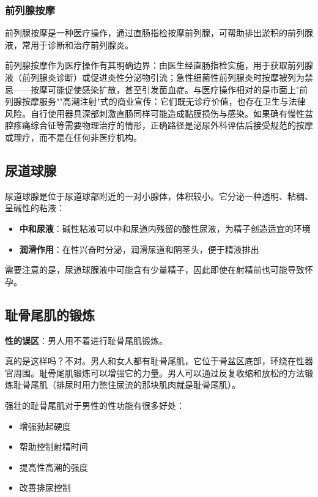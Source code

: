 \documentclass[12pt,a4paper,twoside]{ctexbook}
\begin{document}
\subsubsection{前列腺按摩}

前列腺按摩是一种医疗操作，通过直肠指检按摩前列腺，可帮助排出淤积的前列腺液，常用于诊断和治疗前列腺炎。


前列腺按摩作为医疗操作有其明确边界：由医生经直肠指检实施，用于获取前列腺液（前列腺炎诊断）或促进炎性分泌物引流；急性细菌性前列腺炎时按摩被列为禁忌——按摩可能促使感染扩散，甚至引发菌血症。与医疗操作相对的是市面上"前列腺按摩服务""高潮注射"式的商业宣传：它们既无诊疗价值，也存在卫生与法律风险。自行使用器具深部刺激直肠同样可能造成黏膜损伤与感染。如果确有慢性盆腔疼痛综合征等需要物理治疗的情形，正确路径是泌尿外科评估后接受规范的按摩或理疗，而不是在任何非医疗机构。

\subsection{尿道球腺}

尿道球腺是位于尿道球部附近的一对小腺体，体积较小。它分泌一种透明、粘稠、呈碱性的粘液：
\begin{itemize}
    \item \textbf{中和尿液}：碱性粘液可以中和尿道内残留的酸性尿液，为精子创造适宜的环境
    \item \textbf{润滑作用}：在性兴奋时分泌，润滑尿道和阴茎头，便于精液排出
\end{itemize}

需要注意的是，尿道球腺液中可能含有少量精子，因此即使在射精前也可能导致怀孕。

\subsection{耻骨尾肌的锻炼}

\textbf{性的误区}：男人用不着进行耻骨尾肌锻炼。

真的是这样吗？不对。男人和女人都有耻骨尾肌，它位于骨盆区底部，环绕在性器官周围。耻骨尾肌锻炼可以增强它的力量。男人可以通过反复收缩和放松的方法锻炼耻骨尾肌（排尿时用力憋住尿流的那块肌肉就是耻骨尾肌）。

强壮的耻骨尾肌对于男性的性功能有很多好处：
\begin{itemize}
    \item 增强勃起硬度
    \item 帮助控制射精时间
    \item 提高性高潮的强度
    \item 改善排尿控制
\end{itemize}
\end{document}
